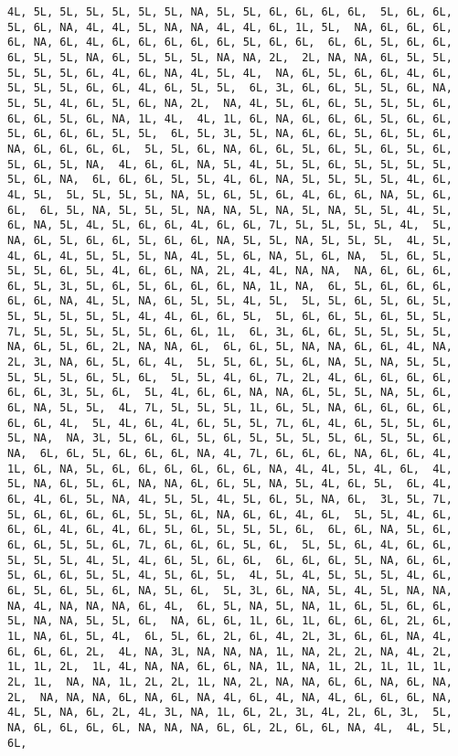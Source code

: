 \documentclass[
]{article}
\begin{document}
\begin{verbatim}
4L, 5L, 5L, 5L, 5L, 5L, 5L, NA, 5L, 5L, 6L, 6L, 6L, 6L,  5L, 6L, 6L, 5L, 6L, NA, 4L, 4L, 5L, NA, NA, 4L, 4L, 6L, 1L, 5L,  NA, 6L, 6L, 6L, 6L, NA, 6L, 4L, 6L, 6L, 6L, 6L, 6L, 5L, 6L, 6L,  6L, 6L, 5L, 6L, 6L, 6L, 5L, 5L, NA, 6L, 5L, 5L, 5L, NA, NA, 2L,  2L, NA, NA, 6L, 5L, 5L, 5L, 5L, 5L, 6L, 4L, 6L, NA, 4L, 5L, 4L,  NA, 6L, 5L, 6L, 6L, 4L, 6L, 5L, 5L, 5L, 6L, 6L, 4L, 6L, 5L, 5L,  6L, 3L, 6L, 6L, 5L, 5L, 6L, NA, 5L, 5L, 4L, 6L, 5L, 6L, NA, 2L,  NA, 4L, 5L, 6L, 6L, 5L, 5L, 5L, 6L, 6L, 6L, 5L, 6L, NA, 1L, 4L,  4L, 1L, 6L, NA, 6L, 6L, 6L, 5L, 6L, 6L, 5L, 6L, 6L, 6L, 5L, 5L,  6L, 5L, 3L, 5L, NA, 6L, 6L, 5L, 6L, 5L, 6L, NA, 6L, 6L, 6L, 6L,  5L, 5L, 6L, NA, 6L, 6L, 5L, 6L, 5L, 6L, 5L, 6L, 5L, 6L, 5L, NA,  4L, 6L, 6L, NA, 5L, 4L, 5L, 5L, 6L, 5L, 5L, 5L, 5L, 5L, 6L, NA,  6L, 6L, 6L, 5L, 5L, 4L, 6L, NA, 5L, 5L, 5L, 5L, 4L, 6L, 4L, 5L,  5L, 5L, 5L, 5L, NA, 5L, 6L, 5L, 6L, 4L, 6L, 6L, NA, 5L, 6L, 6L,  6L, 5L, NA, 5L, 5L, 5L, NA, NA, 5L, NA, 5L, NA, 5L, 5L, 4L, 5L,  6L, NA, 5L, 4L, 5L, 6L, 6L, 4L, 6L, 6L, 7L, 5L, 5L, 5L, 5L, 4L,  5L, NA, 6L, 5L, 6L, 6L, 5L, 6L, 6L, NA, 5L, 5L, NA, 5L, 5L, 5L,  4L, 5L, 4L, 6L, 4L, 5L, 5L, 5L, NA, 4L, 5L, 6L, NA, 5L, 6L, NA,  5L, 6L, 5L, 5L, 5L, 6L, 5L, 4L, 6L, 6L, NA, 2L, 4L, 4L, NA, NA,  NA, 6L, 6L, 6L, 6L, 5L, 3L, 5L, 6L, 5L, 6L, 6L, 6L, NA, 1L, NA,  6L, 5L, 6L, 6L, 6L, 6L, 6L, NA, 4L, 5L, NA, 6L, 5L, 5L, 4L, 5L,  5L, 5L, 6L, 5L, 6L, 5L, 5L, 5L, 5L, 5L, 5L, 4L, 4L, 6L, 6L, 5L,  5L, 6L, 6L, 5L, 6L, 5L, 5L, 7L, 5L, 5L, 5L, 5L, 5L, 6L, 6L, 1L,  6L, 3L, 6L, 6L, 5L, 5L, 5L, 5L, NA, 6L, 5L, 6L, 2L, NA, NA, 6L,  6L, 6L, 5L, NA, NA, 6L, 6L, 4L, NA, 2L, 3L, NA, 6L, 5L, 6L, 4L,  5L, 5L, 6L, 5L, 6L, NA, 5L, NA, 5L, 5L, 5L, 5L, 5L, 6L, 5L, 6L,  5L, 5L, 4L, 6L, 7L, 2L, 4L, 6L, 6L, 6L, 6L, 6L, 6L, 3L, 5L, 6L,  5L, 4L, 6L, 6L, NA, NA, 6L, 5L, 5L, NA, 5L, 6L, 6L, NA, 5L, 5L,  4L, 7L, 5L, 5L, 5L, 1L, 6L, 5L, NA, 6L, 6L, 6L, 6L, 6L, 6L, 4L,  5L, 4L, 6L, 4L, 6L, 5L, 5L, 7L, 6L, 4L, 6L, 5L, 5L, 6L, 5L, NA,  NA, 3L, 5L, 6L, 6L, 5L, 6L, 5L, 5L, 5L, 5L, 6L, 5L, 5L, 6L, NA,  6L, 6L, 5L, 6L, 6L, 6L, NA, 4L, 7L, 6L, 6L, 6L, NA, 6L, 6L, 4L,  1L, 6L, NA, 5L, 6L, 6L, 6L, 6L, 6L, 6L, NA, 4L, 4L, 5L, 4L, 6L,  4L, 5L, NA, 6L, 5L, 6L, NA, NA, 6L, 6L, 5L, NA, 5L, 4L, 6L, 5L,  6L, 4L, 6L, 4L, 6L, 5L, NA, 4L, 5L, 5L, 4L, 5L, 6L, 5L, NA, 6L,  3L, 5L, 7L, 5L, 6L, 6L, 6L, 6L, 5L, 5L, 6L, NA, 6L, 6L, 4L, 6L,  5L, 5L, 4L, 6L, 6L, 6L, 4L, 6L, 4L, 6L, 5L, 6L, 5L, 5L, 5L, 6L,  6L, 6L, NA, 5L, 6L, 6L, 6L, 5L, 5L, 6L, 7L, 6L, 6L, 6L, 5L, 6L,  5L, 5L, 6L, 4L, 6L, 6L, 5L, 5L, 5L, 4L, 5L, 4L, 6L, 5L, 6L, 6L,  6L, 6L, 6L, 5L, NA, 6L, 6L, 5L, 6L, 6L, 5L, 5L, 4L, 5L, 6L, 5L,  4L, 5L, 4L, 5L, 5L, 5L, 4L, 6L, 6L, 5L, 6L, 5L, 6L, NA, 5L, 6L,  5L, 3L, 6L, NA, 5L, 4L, 5L, NA, NA, NA, 4L, NA, NA, NA, 6L, 4L,  6L, 5L, NA, 5L, NA, 1L, 6L, 5L, 6L, 6L, 5L, NA, NA, 5L, 5L, 6L,  NA, 6L, 6L, 1L, 6L, 1L, 6L, 6L, 6L, 2L, 6L, 1L, NA, 6L, 5L, 4L,  6L, 5L, 6L, 2L, 6L, 4L, 2L, 3L, 6L, 6L, NA, 4L, 6L, 6L, 6L, 2L,  4L, NA, 3L, NA, NA, NA, 1L, NA, 2L, 2L, NA, 4L, 2L, 1L, 1L, 2L,  1L, 4L, NA, NA, 6L, 6L, NA, 1L, NA, 1L, 2L, 1L, 1L, 1L, 2L, 1L,  NA, NA, 1L, 2L, 2L, 1L, NA, 2L, NA, NA, 6L, 6L, NA, 6L, NA, 2L,  NA, NA, NA, 6L, NA, 6L, NA, 4L, 6L, 4L, NA, 4L, 6L, 6L, 6L, NA,  4L, 5L, NA, 6L, 2L, 4L, 3L, NA, 1L, 6L, 2L, 3L, 4L, 2L, 6L, 3L,  5L, NA, 6L, 6L, 6L, 6L, NA, NA, NA, 6L, 6L, 2L, 6L, 6L, NA, 4L,  4L, 5L, 6L, 
\end{verbatim}
\end{document}
